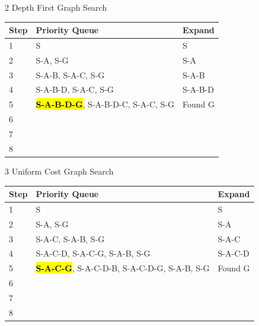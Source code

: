 \documentclass[11pt]{article}
\begin{document}
\clearpage

  \begin{description}

  \item[2 Depth First Graph Search]

  \end{description}

    \begin{center}
    \begin{tabular}{|l|l|l|} \hline
    \bf Step & \bf Priority Queue  & \bf Expand \\ \hline
    1 & S & S \\ \hline
    2 & S-A, S-G  &  S-A\\ \hline
    3 & S-A-B, S-A-C, S-G  & S-A-B \\ \hline
    4 & S-A-B-D, S-A-C, S-G & S-A-B-D \\ \hline
    5 & \textcolor{red}{\textbf{\hl{S-A-B-D-G}}}, S-A-B-D-C, S-A-C, S-G  &  Found G\\ \hline
    6 &   &  \\ \hline
    7 &   &  \\ \hline
    8 &   &  \\ \hline
    \end{tabular}
    \end{center}

  \begin{description}

  \item[3 Uniform Cost Graph Search]

  \end{description}

    \begin{center}
    \begin{tabular}{|l|l|l|} \hline

    \bf Step & \bf Priority Queue  & \bf Expand \\ \hline
    1 & S & S \\ \hline
    2 & S-A, S-G & S-A \\ \hline
    3 & S-A-C, S-A-B, S-G & S-A-C \\ \hline
    4 & S-A-C-D, S-A-C-G, S-A-B, S-G  & S-A-C-D \\ \hline
    5 & \textcolor{red}{\textbf{\hl{S-A-C-G}}}, S-A-C-D-B, S-A-C-D-G, S-A-B, S-G  & Found G \\ \hline
    6 &   &  \\ \hline
    7 &   &  \\ \hline
    8 &   &  \\ \hline
    \end{tabular}
    \end{center}
\end{document}

